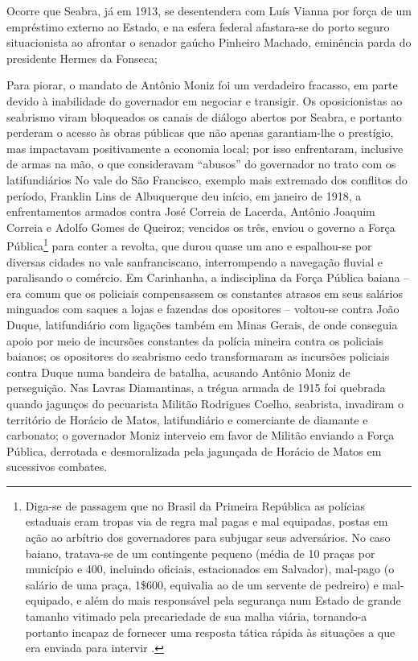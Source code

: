 Ocorre que Seabra, já em 1913, se desentendera com Luís Vianna por força de um empréstimo externo ao Estado, e na esfera federal afastara-se do porto seguro situacionista ao afrontar o senador gaúcho Pinheiro Machado, eminência parda do presidente Hermes da Fonseca; 

Para piorar, o mandato de Antônio Moniz foi um verdadeiro fracasso, em parte devido à inabilidade do governador em negociar e transigir. Os oposicionistas ao seabrismo viram bloqueados os canais de diálogo abertos por Seabra, e portanto perderam o acesso às obras públicas que não apenas garantiam-lhe o prestígio, mas impactavam positivamente a economia local; por isso enfrentaram, inclusive de armas na mão, o que consideravam ``abusos'' do governador no trato com os latifundiários No vale do São Francisco, exemplo mais extremado dos conflitos do período, Franklin Lins de Albuquerque deu início, em janeiro de 1918, a enfrentamentos armados contra José Correia de Lacerda, Antônio Joaquim Correia e Adolfo Gomes de Queiroz; vencidos os três, enviou o governo a Força Pública\footnote{Diga-se de passagem que no Brasil da Primeira República as polícias estaduais eram tropas via de regra mal pagas e mal equipadas, postas em ação ao arbítrio dos governadores para subjugar seus adversários. No caso baiano, tratava-se de um contingente pequeno (média de 10 praças por município e 400, incluindo oficiais, estacionados em Salvador), mal-pago (o salário de uma praça, 1\$600, equivalia ao de um servente de pedreiro) e mal-equipado, e além do mais responsável pela segurança num Estado de grande tamanho vitimado pela precariedade de sua malha viária, tornando-a portanto incapaz de fornecer uma resposta tática rápida às situações a que era enviada para intervir \cite[pp.~46-47]{sampaio_legislativo_1985}.} para conter a revolta, que durou quase um ano e espalhou-se por diversas cidades no vale sanfranciscano, interrompendo a navegação fluvial e paralisando o comércio. Em Carinhanha, a indisciplina da Força Pública baiana -- era comum que os policiais compensassem os constantes atrasos em seus salários minguados com saques a lojas e fazendas dos opositores -- voltou-se contra João Duque, latifundiário com ligações também em Minas Gerais, de onde conseguia apoio por meio de incursões constantes da polícia mineira contra os policiais baianos; os opositores do seabrismo cedo transformaram as incursões policiais contra Duque numa bandeira de batalha, acusando Antônio Moniz de perseguição. Nas Lavras Diamantinas, a trégua armada de 1915 foi quebrada quando jagunços do pecuarista Militão Rodrigues Coelho, seabrista, invadiram o território de Horácio de Matos, latifundiário e comerciante de diamante e carbonato; o governador Moniz interveio em favor de Militão enviando a Força Pública, derrotada e desmoralizada pela jagunçada de Horácio de Matos em sucessivos combates.

